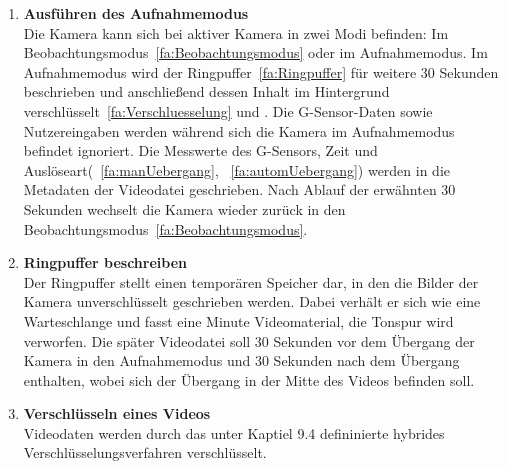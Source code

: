 \begin{enumerate}
\item \label{fa:Aufnahmemodus}\textbf{Ausführen des Aufnahmemodus} \hfill \\
Die Kamera kann sich bei aktiver Kamera in zwei Modi befinden: Im Beobachtungsmodus~\eqref{fa:Beobachtungsmodus} oder im Aufnahmemodus.
Im Aufnahmemodus wird der \gls{Ringpuffer}~\eqref{fa:Ringpuffer} für weitere 30 Sekunden beschrieben und anschließend dessen Inhalt im Hintergrund verschlüsselt~\eqref{fa:Verschluesselung} und . Die \gls{G-Sensor}-Daten sowie Nutzereingaben werden während sich die Kamera im Aufnahmemodus befindet ignoriert. Die Messwerte des G-Sensors, Zeit und Auslöseart(~\eqref{fa:manUebergang}, ~\eqref{fa:automUebergang}) werden in die \gls{Metadaten} der Videodatei geschrieben. Nach Ablauf der erwähnten 30 Sekunden wechselt die Kamera wieder zurück in den Beobachtungsmodus~\eqref{fa:Beobachtungsmodus}.

\item \label{fa:Ringpuffer}\textbf{\gls{Ringpuffer} beschreiben} \hfill \\
Der Ringpuffer stellt einen temporären Speicher dar, in den die Bilder der Kamera unverschlüsselt geschrieben werden. Dabei verhält er sich wie eine Warteschlange und fasst eine Minute Videomaterial, die Tonspur wird verworfen. Die später  Videodatei soll 30 Sekunden vor dem Übergang der Kamera in den Aufnahmemodus und 30 Sekunden nach dem Übergang enthalten, wobei sich der Übergang in der Mitte des Videos befinden soll.

\item \label{fa:Verschluesselung}\textbf{Verschlüsseln eines Videos} \hfill \\
Videodaten werden durch das unter Kaptiel 9.4 defininierte hybrides Verschlüsselungsverfahren verschlüsselt.


\end{enumerate}
